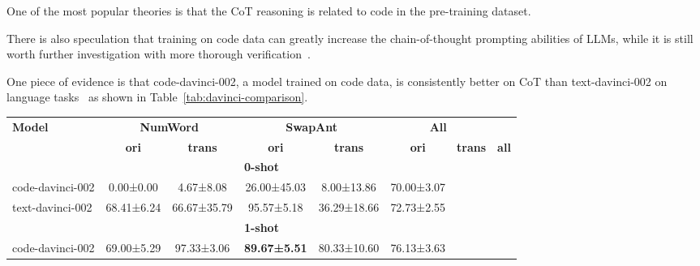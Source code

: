 One of the most popular theories is that the CoT reasoning is related to code in the pre-training dataset.
\begin{displayquote}
	There is also speculation that training on code data can greatly increase the chain-of-thought prompting abilities of LLMs, while it is still worth further investigation with more thorough verification~\cite{survey}.
\end{displayquote}
One piece of evidence is that code-davinci-002, a model trained on code data, is consistently better on CoT than text-davinci-002 on language tasks~\cite{ye2023comprehensivecapabilityanalysisgpt3} as shown in Table~\ref{tab:davinci-comparison}.

\begin{table}[ht]
	\centering
	\begin{tabularx}{\textwidth}{Xccccccc}
		\toprule
		\textbf{Model}   & \multicolumn{2}{c}{\textbf{NumWord}} & \multicolumn{2}{c}{\textbf{SwapAnt}} & \multicolumn{2}{c}{\textbf{All}}                                                                 \\
		                 & \textbf{ori}                         & \textbf{trans}                       & \textbf{ori}                     & \textbf{trans} & \textbf{ori} & \textbf{trans} & \textbf{all} \\
		\midrule
		\multicolumn{8}{c}{\textbf{0-shot}}                                                                                                                                                               \\
		\midrule
		code-davinci-002 & 0.00±0.00                            & 4.67±8.08                            & 26.00±45.03                      & 8.00±13.86     & 70.00±3.07   &                &              \\
		text-davinci-002 & 68.41±6.24                           & 66.67±35.79                          & 95.57±5.18                       & 36.29±18.66    & 72.73±2.55   &                &              \\
		\midrule
		\multicolumn{8}{c}{\textbf{1-shot}}                                                                                                                                                               \\
		\midrule
		code-davinci-002 & 69.00±5.29                           & 97.33±3.06                           & \textbf{89.67±5.51}              & 80.33±10.60    & 76.13±3.63   &                &              \\

\end{tabularx}
\end{table}
